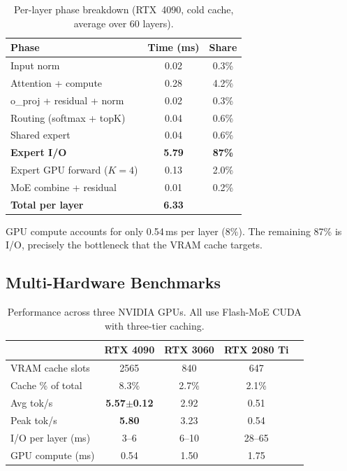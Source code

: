 \documentclass[11pt]{article}
\begin{document}
\begin{table}[h]
\centering
\small
\caption{Per-layer phase breakdown (RTX~4090, cold cache, average over 60 layers).}
\label{tab:timing}
\begin{tabular}{lcc}
\toprule
\textbf{Phase} & \textbf{Time (ms)} & \textbf{Share} \\
\midrule
Input norm & 0.02 & 0.3\% \\
Attention + compute & 0.28 & 4.2\% \\
o\_proj + residual + norm & 0.02 & 0.3\% \\
Routing (softmax + topK) & 0.04 & 0.6\% \\
Shared expert & 0.04 & 0.6\% \\
\textbf{Expert I/O} & \textbf{5.79} & \textbf{87\%} \\
Expert GPU forward ($K=4$) & 0.13 & 2.0\% \\
MoE combine + residual & 0.01 & 0.2\% \\
\midrule
\textbf{Total per layer} & \textbf{6.33} & \\
\bottomrule
\end{tabular}
\end{table}

GPU compute accounts for only 0.54\,ms per layer (8\%). The remaining 87\% is I/O, precisely the bottleneck that the VRAM cache targets.

\subsection{Multi-Hardware Benchmarks}

\begin{table}[h]
\centering
\small
\caption{Performance across three NVIDIA GPUs. All use Flash-MoE CUDA with three-tier caching.}
\label{tab:multi}
\begin{tabular}{lcccc}
\toprule
& \textbf{RTX 4090} & \textbf{RTX 3060} & \textbf{RTX 2080 Ti} \\
\midrule
VRAM cache slots & 2565 & 840 & 647 \\
Cache \% of total & 8.3\% & 2.7\% & 2.1\% \\
Avg tok/s & \textbf{5.57$\pm$0.12} & 2.92 & 0.51 \\
Peak tok/s & \textbf{5.80} & 3.23 & 0.54 \\
I/O per layer (ms) & 3--6 & 6--10 & 28--65 \\
GPU compute (ms) & 0.54 & 1.50 & 1.75 \\
\bottomrule
\end{tabular}
\end{table}
\end{document}
